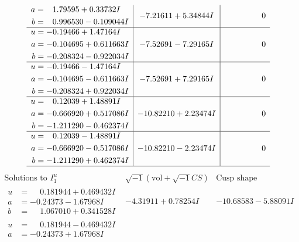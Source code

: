 \documentclass[1p]{elsarticle_modified}
\theoremstyle{definition}
\newcommand{\I}{\sqrt{-1}}
\begin{document}
$$\begin{array}{c|c|c}
\begin{aligned}
a &= \phantom{-}1.79595 + 0.33732 I \\
b &= \phantom{-}0.996530 - 0.109044 I\end{aligned}
 & -7.21611 + 5.34844 I & \phantom{-0.000000 } 0 \\ \hline\begin{aligned}
u &= -0.19466 + 1.47164 I \\
a &= -0.104695 + 0.611663 I \\
b &= -0.208324 - 0.922034 I\end{aligned}
 & -7.52691 - 7.29165 I & \phantom{-0.000000 } 0 \\ \hline\begin{aligned}
u &= -0.19466 - 1.47164 I \\
a &= -0.104695 - 0.611663 I \\
b &= -0.208324 + 0.922034 I\end{aligned}
 & -7.52691 + 7.29165 I & \phantom{-0.000000 } 0 \\ \hline\begin{aligned}
u &= \phantom{-}0.12039 + 1.48891 I \\
a &= -0.666920 + 0.517086 I \\
b &= -1.211290 - 0.462374 I\end{aligned}
 & -10.82210 + 2.23474 I & \phantom{-0.000000 } 0 \\ \hline\begin{aligned}
u &= \phantom{-}0.12039 - 1.48891 I \\
a &= -0.666920 - 0.517086 I \\
b &= -1.211290 + 0.462374 I\end{aligned}
 & -10.82210 - 2.23474 I & \phantom{-0.000000 } 0\\
 \hline 
 \end{array}$$\newpage$$\begin{array}{c|c|c}  
\text{Solutions to }I^u_{1}& \I (\text{vol} + \sqrt{-1}CS) & \text{Cusp shape}\\
 \hline 
\begin{aligned}
u &= \phantom{-}0.181944 + 0.469432 I \\
a &= -0.24373 - 1.67968 I \\
b &= \phantom{-}1.067010 + 0.341528 I\end{aligned}
 & -4.31911 + 0.78254 I & -10.68583 - 5.88091 I \\ \hline\begin{aligned}
u &= \phantom{-}0.181944 - 0.469432 I \\
a &= -0.24373 + 1.67968 I \\

\end{aligned}
\end{array}$$
\end{document}
